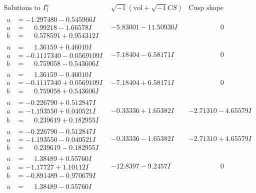 \documentclass[1p]{elsarticle_modified}
\theoremstyle{definition}
\newcommand{\I}{\sqrt{-1}}
\begin{document}
$$\begin{array}{c|c|c}
\text{Solutions to }I^u_{1}& \I (\text{vol} + \sqrt{-1}CS) & \text{Cusp shape}\\
 \hline 
\begin{aligned}
u &= -1.297480 - 0.545966 I \\
a &= \phantom{-}0.99218 - 1.66578 I \\
b &= \phantom{-}0.578591 + 0.954312 I\end{aligned}
 & -5.83001 - 11.50930 I & \phantom{-0.000000 } 0 \\ \hline\begin{aligned}
u &= \phantom{-}1.36159 + 0.46010 I \\
a &= -0.1117340 - 0.0569109 I \\
b &= \phantom{-}0.759058 - 0.543606 I\end{aligned}
 & -7.18404 - 6.58171 I & \phantom{-0.000000 } 0 \\ \hline\begin{aligned}
u &= \phantom{-}1.36159 - 0.46010 I \\
a &= -0.1117340 + 0.0569109 I \\
b &= \phantom{-}0.759058 + 0.543606 I\end{aligned}
 & -7.18404 + 6.58171 I & \phantom{-0.000000 } 0 \\ \hline\begin{aligned}
u &= -0.226790 + 0.512847 I \\
a &= -1.193550 + 0.040521 I \\
b &= \phantom{-}0.239619 + 0.182955 I\end{aligned}
 & -0.33336 + 1.65382 I & -2.71310 - 4.65579 I \\ \hline\begin{aligned}
u &= -0.226790 - 0.512847 I \\
a &= -1.193550 - 0.040521 I \\
b &= \phantom{-}0.239619 - 0.182955 I\end{aligned}
 & -0.33336 - 1.65382 I & -2.71310 + 4.65579 I \\ \hline\begin{aligned}
u &= \phantom{-}1.38489 + 0.55760 I \\
a &= -1.17727 + 1.10112 I \\
b &= -0.891489 - 0.970679 I\end{aligned}
 & -12.8397 - 9.2457 I & \phantom{-0.000000 } 0 \\ \hline\begin{aligned}
u &= \phantom{-}1.38489 - 0.55760 I \\

\end{aligned}
\end{array}$$
\end{document}
